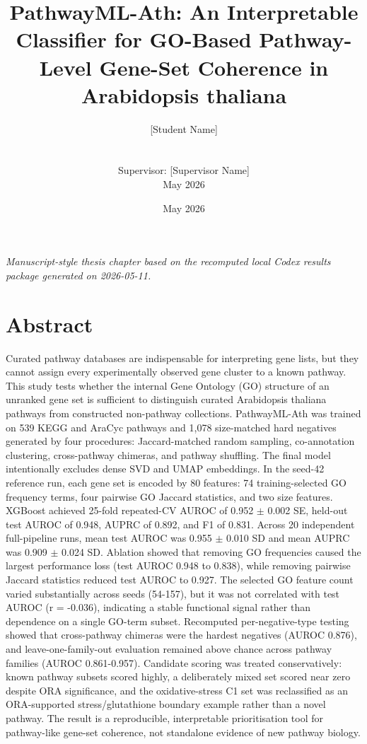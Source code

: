 \documentclass[11pt]{article}
\title{PathwayML-Ath: An Interpretable Classifier for GO-Based Pathway-Level Gene-Set Coherence in Arabidopsis thaliana}
\author{[Student Name] \\ [Department / Programme] \\ [University] \\ Supervisor: [Supervisor Name] \\ May 2026}
\date{May 2026}
\begin{document}
\maketitle
\begin{center}\textit{Manuscript-style thesis chapter based on the recomputed local Codex results package generated on 2026-05-11.}\end{center}

\section{Abstract}
Curated pathway databases are indispensable for interpreting gene lists, but they cannot assign every experimentally observed gene cluster to a known pathway. This study tests whether the internal Gene Ontology (GO) structure of an unranked gene set is sufficient to distinguish curated Arabidopsis thaliana pathways from constructed non-pathway collections. PathwayML-Ath was trained on 539 KEGG and AraCyc pathways and 1,078 size-matched hard negatives generated by four procedures: Jaccard-matched random sampling, co-annotation clustering, cross-pathway chimeras, and pathway shuffling. The final model intentionally excludes dense SVD and UMAP embeddings. In the seed-42 reference run, each gene set is encoded by 80 features: 74 training-selected GO frequency terms, four pairwise GO Jaccard statistics, and two size features. XGBoost achieved 25-fold repeated-CV AUROC of 0.952 $\pm$ 0.002 SE, held-out test AUROC of 0.948, AUPRC of 0.892, and F1 of 0.831. Across 20 independent full-pipeline runs, mean test AUROC was 0.955 $\pm$ 0.010 SD and mean AUPRC was 0.909 $\pm$ 0.024 SD. Ablation showed that removing GO frequencies caused the largest performance loss (test AUROC 0.948 to 0.838), while removing pairwise Jaccard statistics reduced test AUROC to 0.927. The selected GO feature count varied substantially across seeds (54-157), but it was not correlated with test AUROC (r = -0.036), indicating a stable functional signal rather than dependence on a single GO-term subset. Recomputed per-negative-type testing showed that cross-pathway chimeras were the hardest negatives (AUROC 0.876), and leave-one-family-out evaluation remained above chance across pathway families (AUROC 0.861-0.957). Candidate scoring was treated conservatively: known pathway subsets scored highly, a deliberately mixed set scored near zero despite ORA significance, and the oxidative-stress C1 set was reclassified as an ORA-supported stress/glutathione boundary example rather than a novel pathway. The result is a reproducible, interpretable prioritisation tool for pathway-like gene-set coherence, not standalone evidence of new pathway biology.
\end{document}
